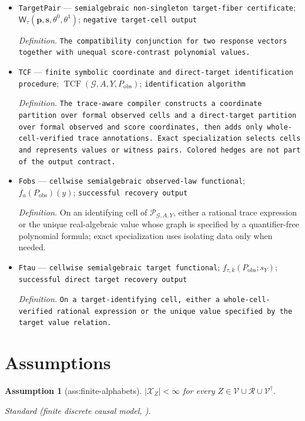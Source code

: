 \documentclass{article}
\newtheorem{assumption}{Assumption}
\begin{document}
\begin{itemize}
  \item \texttt{TargetPair} --- \texttt{semialgebraic non-\allowbreak{}singleton target-\allowbreak{}fiber certificate}; \(\mathsf W_{\tau}(\mathbf p,\mathbf s,\theta^0,\theta^1)\); \texttt{negative target-\allowbreak{}cell output}
  \par\smallskip\noindent\emph{Definition.} \texttt{The compatibility conjunction for two response vectors together with unequal score-\allowbreak{}contrast polynomial values.}
  \item \texttt{TCF} --- \texttt{finite symbolic coordinate and direct-\allowbreak{}target identification procedure}; \(\operatorname{TCF}(\mathcal G,A,Y,P_{\mathrm{obs}})\); \texttt{identification algorithm}
  \par\smallskip\noindent\emph{Definition.} \texttt{The trace-\allowbreak{}aware compiler constructs a coordinate partition over formal observed cells and a direct-\allowbreak{}target partition over formal observed and score coordinates,\allowbreak{} then adds only whole-\allowbreak{}cell-\allowbreak{}verified trace annotations. Exact specialization selects cells and represents values or witness pairs. Colored hedges are not part of the output contract.}
  \item \texttt{Fobs} --- \texttt{cellwise semialgebraic observed-\allowbreak{}law functional}; \(f_a(P_{\mathrm{obs}})(y)\); \texttt{successful recovery output}
  \par\smallskip\noindent\emph{Definition.} On an identifying cell of \(\mathscr P_{\mathcal G,A,Y}\), either a rational trace expression or the unique real-algebraic value whose graph is specified by a quantifier-free polynomial formula; exact specialization uses isolating data only when needed.
  \item \texttt{Ftau} --- \texttt{cellwise semialgebraic target functional}; \(f_{\tau,k}(P_{\mathrm{obs}};s_Y)\); \texttt{successful direct target recovery output}
  \par\smallskip\noindent\emph{Definition.} \texttt{On a target-\allowbreak{}identifying cell,\allowbreak{} either a whole-\allowbreak{}cell-\allowbreak{}verified rational expression or the unique value specified by the target value relation.}
\end{itemize}

\section{Assumptions}

\begin{assumption}[ass:finite-alphabets]\label{ass:finite-alphabets}
\(|\mathcal X_Z|<\infty\) for every \(Z\in\mathcal V\cup\mathcal R\cup\mathcal V^{\dagger}\).
\par\smallskip\noindent\emph{Standard} (finite discrete causal model, \cite{ShpitserPearl2006JointID}).
\end{assumption}
\end{document}
